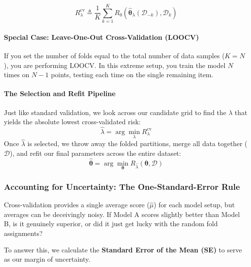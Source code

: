 \documentclass{article}
\begin{document}
\begin{equation}
R^{\text{cv}}_\lambda \triangleq \frac{1}{K} \sum_{k=1}^{K} R_0\left(\hat{\boldsymbol{\theta}}_\lambda(\mathcal{D}_{-k}), \mathcal{D}_k\right)
\end{equation}

\paragraph{Special Case: Leave-One-Out Cross-Validation (LOOCV)}
If you set the number of folds equal to the total number of data samples ($K = N$), you are performing LOOCV. In this extreme setup, you train the model $N$ times on $N-1$ points, testing each time on the single remaining item.

\paragraph{The Selection and Refit Pipeline}
Just like standard validation, we look across our candidate grid to find the $\lambda$ that yields the absolute lowest cross-validated risk:
\begin{equation}
\hat{\lambda} = \arg\min_\lambda R^{\text{cv}}_\lambda
\end{equation}
Once $\hat{\lambda}$ is selected, we throw away the folded partitions, merge all data together ($\mathcal{D}$), and refit our final parameters across the entire dataset:
\begin{equation}
\hat{\boldsymbol{\theta}} = \arg\min_{\boldsymbol{\theta}} R_{\hat{\lambda}}(\boldsymbol{\theta}, \mathcal{D})
\end{equation}

\subsubsection{Accounting for Uncertainty: The One-Standard-Error Rule}
Cross-validation provides a single average score ($\hat{\mu}$) for each model setup, but averages can be deceivingly noisy. If Model A scores slightly better than Model B, is it genuinely superior, or did it just get lucky with the random fold assignments?

To answer this, we calculate the \textbf{Standard Error of the Mean (SE)} to serve as our margin of uncertainty.
\end{document}
